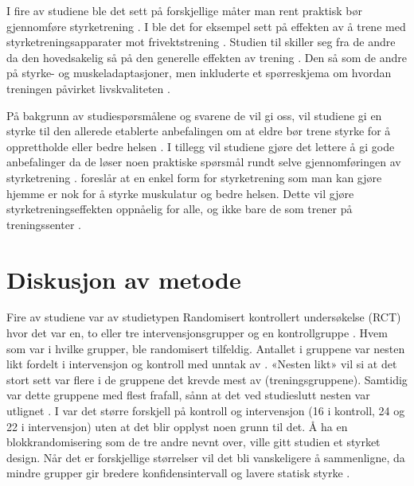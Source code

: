 \documentclass[
]{book}
\begin{document}
I fire av studiene ble det sett på forskjellige måter man rent praktisk bør gjennomføre styrketrening \citetext{\citealp[ ]{schott2019}; \citealp{turpela2017}; \citealp{vikberg2019}; \citealp{vincent2002}}. I \citet{schott2019} ble det for eksempel sett på effekten av å trene med styrketreningsapparater mot frivektstrening \citep{schott2019}. Studien til \citet{geirsdottir2012} skiller seg fra de andre da den hovedsakelig så på den generelle effekten av trening \citep{geirsdottir2012}. Den så som de andre på styrke- og muskeladaptasjoner, men inkluderte et spørreskjema om hvordan treningen påvirket livskvaliteten \citep{geirsdottir2012}.

På bakgrunn av studiespørsmålene og svarene de vil gi oss, vil studiene gi en styrke til den allerede etablerte anbefalingen om at eldre bør trene styrke for å opprettholde eller bedre helsen \citep[ \citet{vincent2002}]{geirsdottir2012, schott2019, turpela2017, vikberg2019}. I tillegg vil studiene gjøre det lettere å gi gode anbefalinger da de løser noen praktiske spørsmål rundt selve gjennomføringen av styrketrening \citetext{\citealp[ ]{geirsdottir2012}; \citealp{schott2019}; \citealp{turpela2017}; \citealp{vikberg2019}; \citealp{vincent2002}}. \citet{vikberg2019} foreslår at en enkel form for styrketrening som man kan gjøre hjemme er nok for å styrke muskulatur og bedre helsen. Dette vil gjøre styrketreningseffekten oppnåelig for alle, og ikke bare de som trener på treningssenter \citep{vikberg2019}.

\hypertarget{diskusjon-av-metode}{%
\section{Diskusjon av metode}\label{diskusjon-av-metode}}

Fire av studiene var av studietypen Randomisert kontrollert undersøkelse (RCT) hvor det var en, to eller tre intervensjonsgrupper og en kontrollgruppe \citep{schott2019, turpela2017, vikberg2019, vincent2002}. Hvem som var i hvilke grupper, ble randomisert tilfeldig. Antallet i gruppene var nesten likt fordelt i intervensjon og kontroll med unntak av \citet{vincent2002}. «Nesten likt» vil si at det stort sett var flere i de gruppene det krevde mest av (treningsgruppene). Samtidig var dette gruppene med flest frafall, sånn at det ved studieslutt nesten var utlignet \citep{schott2019, turpela2017, vikberg2019}. I \citet{vincent2002} var det større forskjell på kontroll og intervensjon (16 i kontroll, 24 og 22 i intervensjon) uten at det blir opplyst noen grunn til det. Å ha en blokkrandomisering som de tre andre nevnt over, ville gitt studien et styrket design. Når det er forskjellige størrelser vil det bli vanskeligere å sammenligne, da mindre grupper gir bredere konfidensintervall og lavere statisk styrke \citep[s. 63, 146]{hulley2013}.
\end{document}
